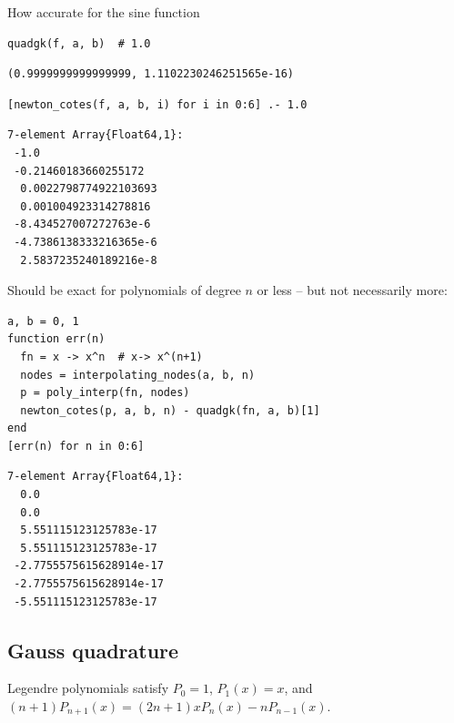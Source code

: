 \documentclass[12pt]{article}
\begin{document}
How accurate for the sine function

\begin{Verbatim}[framesep=1mm,frame=leftline,fontfamily=courier,formatcom=\color{darker-gray}]
quadgk(f, a, b)  # 1.0
\end{Verbatim}
\begin{Verbatim}[framesep=3mm,frame=leftline, fontshape=it,formatcom=\color{darker-gray}]
(0.9999999999999999, 1.1102230246251565e-16)
\end{Verbatim}
 
\begin{Verbatim}[framesep=1mm,frame=leftline,fontfamily=courier,formatcom=\color{darker-gray}]
[newton_cotes(f, a, b, i) for i in 0:6] .- 1.0
\end{Verbatim}
\begin{Verbatim}[framesep=3mm,frame=leftline, fontshape=it,formatcom=\color{darker-gray}]
7-element Array{Float64,1}:
 -1.0                  
 -0.21460183660255172  
  0.0022798774922103693
  0.001004923314278816 
 -8.434527007272763e-6 
 -4.7386138333216365e-6
  2.5837235240189216e-8
\end{Verbatim}
 

Should be exact for polynomials of degree $n$ or less – but not necessarily more:

\begin{Verbatim}[framesep=1mm,frame=leftline,fontfamily=courier,formatcom=\color{darker-gray}]
a, b = 0, 1
function err(n)
  fn = x -> x^n  # x-> x^(n+1)
  nodes = interpolating_nodes(a, b, n)
  p = poly_interp(fn, nodes)
  newton_cotes(p, a, b, n) - quadgk(fn, a, b)[1]
end
[err(n) for n in 0:6]
\end{Verbatim}
\begin{Verbatim}[framesep=3mm,frame=leftline, fontshape=it,formatcom=\color{darker-gray}]
7-element Array{Float64,1}:
  0.0                   
  0.0                   
  5.551115123125783e-17 
  5.551115123125783e-17 
 -2.7755575615628914e-17
 -2.7755575615628914e-17
 -5.551115123125783e-17 
\end{Verbatim}
 
\subsection{Gauss quadrature}


Legendre polynomials satisfy $P_0=1$, $P_1(x) = x$, and $(n+1)P_{n+1}(x) = (2n+1)xP_n(x) -nP_{n-1}(x)$.
\end{document}
